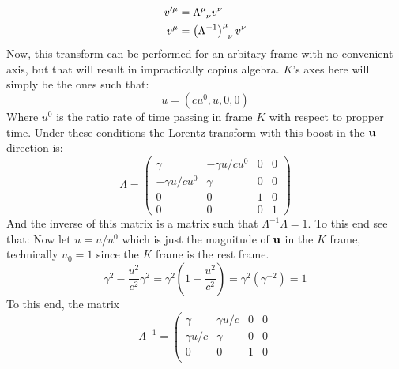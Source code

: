 \documentclass[12pt,a4]{article}
\begin{document}
\begin{enumerate}
\begin{enumerate}
        \begin{align*}
          v'^\mu &= \tensor{\Lambda}{^{\mu}_\nu} v^\nu\\
          v^\mu &= \tensor{\left(\Lambda^{-1}\right)}{^{\mu}_\nu} v^\nu
        \end{align*}
        Now, this transform can be performed for an arbitary frame with no convenient axis, but that will result in impractically copius algebra. $K$'s axes here will simply be the ones such that:
        \begin{equation*}
          u = \left(
                cu^0, u, 0, 0
              \right)
        \end{equation*}
        Where $u^0$ is the ratio rate of time passing in frame $K$ with respect to propper time.
        Under these conditions the Lorentz transform with this boost in the ${\bf u}$ direction is:
        \begin{equation*}
          \Lambda = \left(\begin{matrix}
                      \gamma          &         -\gamma u / cu^0 & 0 & 0\\ 
                      -\gamma u / cu^0 & \gamma                 & 0 & 0\\ 
                      0               & 0                      & 1 & 0\\ 
                      0               & 0                      & 0 & 1
                    \end{matrix}\right)
        \end{equation*}
        And the inverse of this matrix is a matrix such that $\Lambda^{-1}\Lambda = 1$. To this end see that:
        Now let $u = u / u^0$ which is just the magnitude of ${\bf u}$ in the $K$ frame, technically $u_0 = 1$ since the $K$ frame is the rest frame.
        \begin{equation*}
          \gamma^2 - \frac{u^2}{c^2} \gamma ^2 = \gamma^2(1 - \frac{u^2}{c^2}) = \gamma^2 (\gamma^{-2}) = 1
        \end{equation*}
        To this end, the matrix
        \begin{equation*}
          \Lambda^{-1} = \left(\begin{matrix}
                      \gamma         &        \gamma u / c & 0 & 0\\ 
                      \gamma u / c & \gamma                & 0 & 0\\ 
                      0              & 0                     & 1 & 0\\ 

\end{matrix}
\end{equation*}
\end{enumerate}
\end{enumerate}
\end{document}
